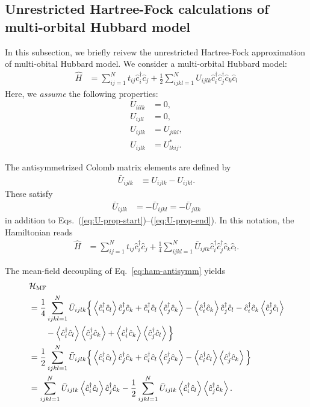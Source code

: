 \documentclass[submission, LectureNotes]{SciPost}
\begin{document}
\clearpage
\subsection{Unrestricted Hartree-Fock calculations of multi-orbital Hubbard model}
In this subsection, we briefly reivew the unrestricted Hartree-Fock approximation of multi-obital Hubbard model.
We consider a multi-orbital Hubbard model:
\begin{align}
    \hat{H} &= \sum_{ij=1}^N t_{ij} \hat{c}^\dagger_i \hat{c}_j + \frac{1}{2} \sum_{ijkl=1}^N U_{ijlk}\hat{c}^\dagger_i \hat{c}^\dagger_j \hat{c}_k \hat{c}_l
\end{align}
Here, we \textit{assume} the following properties:
\begin{align}
U_{iilk} &= 0,\label{eq:U-prop-start}\\
U_{ijll} &= 0,\\
U_{ijlk} &= U_{jikl}, \\
U_{ijlk} &= U_{lkij}^*.\label{eq:U-prop-end}
\end{align}

The antisymmetrized Colomb matrix elements are defined by
\begin{align}
    \bar{U}_{ijlk} &\equiv U_{ijlk} - U_{ijkl}.
\end{align}
These satisfy
\begin{align}
\bar{U}_{ijlk} &= -\bar{U}_{ijkl} = -\bar{U}_{jilk}
\end{align}
in addition to Eqs.~(\ref{eq:U-prop-start})--(\ref{eq:U-prop-end}).
In this notation, the Hamiltonian reads
\begin{align}
    \hat{H} &= \sum_{ij=1}^N t_{ij} \hat{c}^\dagger_i \hat{c}_j + \frac{1}{4} \sum_{ijkl=1}^N \bar{U}_{ijlk}\hat{c}^\dagger_i \hat{c}^\dagger_j \hat{c}_k \hat{c}_l.\label{eq:ham-antisymm}
\end{align}

The mean-field decoupling of Eq.~\eqref{eq:ham-antisymm} yields
\begin{align}
& \mathcal{H}_\mathrm{MF} \nonumber \\
& = \frac{1}{4} \sum_{ijkl=1}^N \bar{U}_{ijlk}
\Big\{
\expval{\hat{c}^\dagger_i \hat{c}_l} \hat{c}^\dagger_j \hat{c}_k
+\hat{c}^\dagger_i \hat{c}_l \expval{\hat{c}^\dagger_j \hat{c}_k}
-\expval{\hat{c}^\dagger_i \hat{c}_k} \hat{c}^\dagger_j \hat{c}_l
-\hat{c}^\dagger_i \hat{c}_k \expval{\hat{c}^\dagger_j \hat{c}_l}\\
&\hspace{2em} - \expval{\hat{c}^\dagger_i \hat{c}_l} \expval{\hat{c}^\dagger_j \hat{c}_k} + \expval{\hat{c}^\dagger_i \hat{c}_k} \expval{\hat{c}^\dagger_j \hat{c}_l}
\Big\}\nonumber\\
& = \frac{1}{2} \sum_{ijkl=1}^N \bar{U}_{ijlk}
\Big\{
\expval{\hat{c}^\dagger_i \hat{c}_l} \hat{c}^\dagger_j \hat{c}_k
+\hat{c}^\dagger_i \hat{c}_l \expval{\hat{c}^\dagger_j \hat{c}_k}
-\expval{\hat{c}^\dagger_i \hat{c}_l} \expval{\hat{c}^\dagger_j \hat{c}_k} 
\Big\}\nonumber \\
&= \sum_{ijkl=1}^N \bar{U}_{ijlk}
\expval{\hat{c}^\dagger_i \hat{c}_l} \hat{c}^\dagger_j \hat{c}_k
-\frac{1}{2}\sum_{ijkl=1}^N \bar{U}_{ijlk}\expval{\hat{c}^\dagger_i \hat{c}_l} \expval{\hat{c}^\dagger_j \hat{c}_k} 
.
\end{align}
\end{document}
